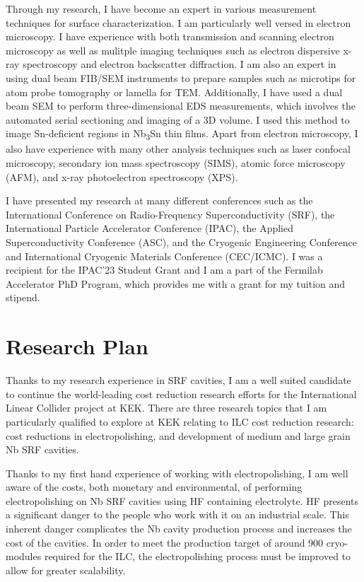 \documentclass[]{revtex4-2}
\begin{document}
    Through my research, I have become an expert in various measurement techniques for surface characterization. I am particularly well versed in electron microscopy. I have experience with both transmission and scanning electron microscopy\cite{viklund2023improving} as well as mulitple imaging techniques such as electron dispersive x-ray spectroscopy and electron backscatter diffraction. I am also an expert in using dual beam FIB/SEM instruments to prepare samples such as microtips for atom probe tomography or lamella for TEM. Additionally, I have used a dual beam SEM to perform three-dimensional EDS measurements, which involves the automated serial sectioning and imaging of a 3D volume. I used this method to image Sn-deficient regions in Nb\textsubscript{3}Sn thin films. \cite{viklund2023three} Apart from electron microscopy, I also have experience with many other analysis techniques such as laser confocal microscopy, secondary ion mass spectroscopy (SIMS), atomic force microscopy (AFM), and x-ray photoelectron spectroscopy (XPS).

    I have presented my research at many different conferences such as the International Conference on Radio-Frequency Superconductivity (SRF), the International Particle Accelerator Conference (IPAC), the Applied Superconductivity Conference (ASC), and the Cryogenic Engineering Conference and International Cryogenic Materials Conference (CEC/ICMC). I was a recipient for the IPAC'23 Student Grant and I am a part of the Fermilab Accelerator PhD Program, which provides me with a grant for my tuition and stipend.





\section{Research Plan}


    Thanks to my research experience in SRF cavities, I am a well suited candidate to continue the world-leading cost reduction research efforts for the International Linear Collider project at KEK. There are three research topics that I am particularly qualified to explore at KEK relating to ILC cost reduction research: cost reductions in electropolishing, and development of medium and large grain Nb SRF cavities.
    
    Thanks to my first hand experience of working with electropolishing, I am well aware of the costs, both monetary and environmental, of performing electropolishing on Nb SRF cavities using HF containing electrolyte. HF presents a significant danger to the people who work with it on an industrial scale. This inherent danger complicates the Nb cavity production process and increases the cost of the cavities. In order to meet the production target of around 900 cryo-modules required for the ILC, the electropolishing process must be improved to allow for greater scalability.
\end{document}

